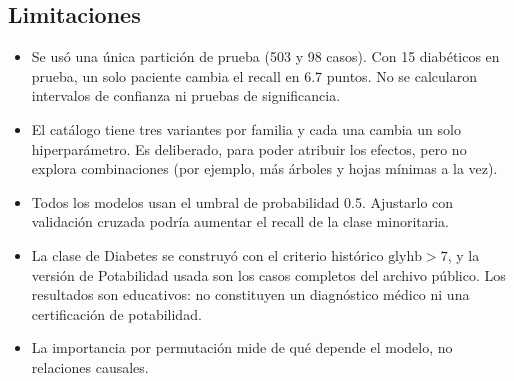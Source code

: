 \subsection{Limitaciones}
\begin{itemize}
\item Se usó una única partición de prueba (503 y 98 casos). Con 15 diabéticos en
prueba, un solo paciente cambia el recall en 6.7 puntos. No se calcularon intervalos de
confianza ni pruebas de significancia.
\item El catálogo tiene tres variantes por familia y cada una cambia un solo
hiperparámetro. Es deliberado, para poder atribuir los efectos, pero no explora
combinaciones (por ejemplo, más árboles y hojas mínimas a la vez).
\item Todos los modelos usan el umbral de probabilidad 0.5. Ajustarlo con validación
cruzada podría aumentar el recall de la clase minoritaria.
\item La clase de Diabetes se construyó con el criterio histórico $\text{glyhb}>7$, y la
versión de Potabilidad usada son los casos completos del archivo público. Los resultados
son educativos: no constituyen un diagnóstico médico ni una certificación de potabilidad.
\item La importancia por permutación mide de qué depende el modelo, no relaciones
causales.
\end{itemize}

